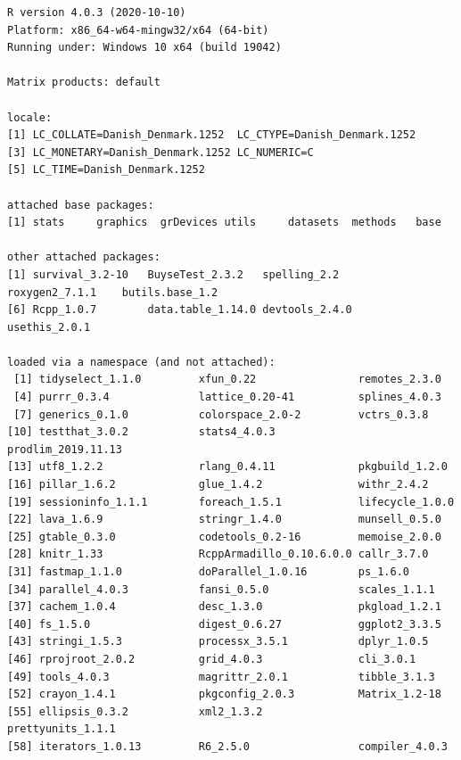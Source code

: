 \documentclass[12pt]{article}
\begin{document}
\begin{verbatim}
R version 4.0.3 (2020-10-10)
Platform: x86_64-w64-mingw32/x64 (64-bit)
Running under: Windows 10 x64 (build 19042)

Matrix products: default

locale:
[1] LC_COLLATE=Danish_Denmark.1252  LC_CTYPE=Danish_Denmark.1252   
[3] LC_MONETARY=Danish_Denmark.1252 LC_NUMERIC=C                   
[5] LC_TIME=Danish_Denmark.1252    

attached base packages:
[1] stats     graphics  grDevices utils     datasets  methods   base     

other attached packages:
[1] survival_3.2-10   BuyseTest_2.3.2   spelling_2.2      roxygen2_7.1.1    butils.base_1.2  
[6] Rcpp_1.0.7        data.table_1.14.0 devtools_2.4.0    usethis_2.0.1    

loaded via a namespace (and not attached):
 [1] tidyselect_1.1.0         xfun_0.22                remotes_2.3.0           
 [4] purrr_0.3.4              lattice_0.20-41          splines_4.0.3           
 [7] generics_0.1.0           colorspace_2.0-2         vctrs_0.3.8             
[10] testthat_3.0.2           stats4_4.0.3             prodlim_2019.11.13      
[13] utf8_1.2.2               rlang_0.4.11             pkgbuild_1.2.0          
[16] pillar_1.6.2             glue_1.4.2               withr_2.4.2             
[19] sessioninfo_1.1.1        foreach_1.5.1            lifecycle_1.0.0         
[22] lava_1.6.9               stringr_1.4.0            munsell_0.5.0           
[25] gtable_0.3.0             codetools_0.2-16         memoise_2.0.0           
[28] knitr_1.33               RcppArmadillo_0.10.6.0.0 callr_3.7.0             
[31] fastmap_1.1.0            doParallel_1.0.16        ps_1.6.0                
[34] parallel_4.0.3           fansi_0.5.0              scales_1.1.1            
[37] cachem_1.0.4             desc_1.3.0               pkgload_1.2.1           
[40] fs_1.5.0                 digest_0.6.27            ggplot2_3.3.5           
[43] stringi_1.5.3            processx_3.5.1           dplyr_1.0.5             
[46] rprojroot_2.0.2          grid_4.0.3               cli_3.0.1               
[49] tools_4.0.3              magrittr_2.0.1           tibble_3.1.3            
[52] crayon_1.4.1             pkgconfig_2.0.3          Matrix_1.2-18           
[55] ellipsis_0.3.2           xml2_1.3.2               prettyunits_1.1.1       
[58] iterators_1.0.13         R6_2.5.0                 compiler_4.0.3
\end{verbatim}
\end{document}

